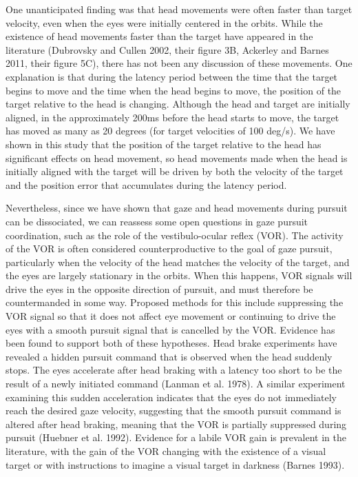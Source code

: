 \documentclass[12pt]{article}
\begin{document}
One unanticipated finding was that head movements were often faster than target velocity, even when the eyes were initially centered in the orbits. While the existence of head movements faster than the target have appeared in the literature (Dubrovsky and Cullen 2002, their figure 3B, Ackerley and Barnes 2011, their figure 5C), there has not been any discussion of these movements.  One explanation is that during the latency period between the time that the target begins to move and the time when the head begins to move, the position of the target relative to the head is changing. Although the head and target are initially aligned, in the approximately 200ms before the head starts to move, the target has moved as many as 20 degrees (for target velocities of 100 deg/s). We have shown in this study that the position of the target relative to the head has significant effects on head movement, so head movements made when the head is initially aligned with the target will be driven by both the velocity of the target and the position error that accumulates during the latency period. 

Nevertheless, since we have shown that gaze and head movements during pursuit can be dissociated, we can reassess some open questions in gaze pursuit coordination, such as the role of the vestibulo-ocular reflex (VOR). The activity of the VOR is often considered counterproductive to the goal of gaze pursuit, particularly when the velocity of the head matches the velocity of the target, and the eyes are largely stationary in the orbits. When this happens, VOR signals will drive the eyes in the opposite direction of pursuit, and must therefore be countermanded in some way. Proposed methods for this include suppressing the VOR signal so that it does not affect eye movement or continuing to drive the eyes with a smooth pursuit signal that is cancelled by the VOR. Evidence has been found to support both of these hypotheses. Head brake experiments have revealed a hidden pursuit command that is observed when the head suddenly stops. The eyes accelerate after head braking with a latency too short to be the result of a newly initiated command (Lanman et al. 1978). A similar experiment examining this sudden acceleration indicates that the eyes do not immediately reach the desired gaze velocity, suggesting that the smooth pursuit command is altered after head braking, meaning that the VOR is partially suppressed during pursuit (Huebner et al. 1992). Evidence for a labile VOR gain is prevalent in the literature, with the gain of the VOR changing with the existence of a visual target or with instructions to imagine a visual target in darkness (Barnes 1993). 
\end{document}
